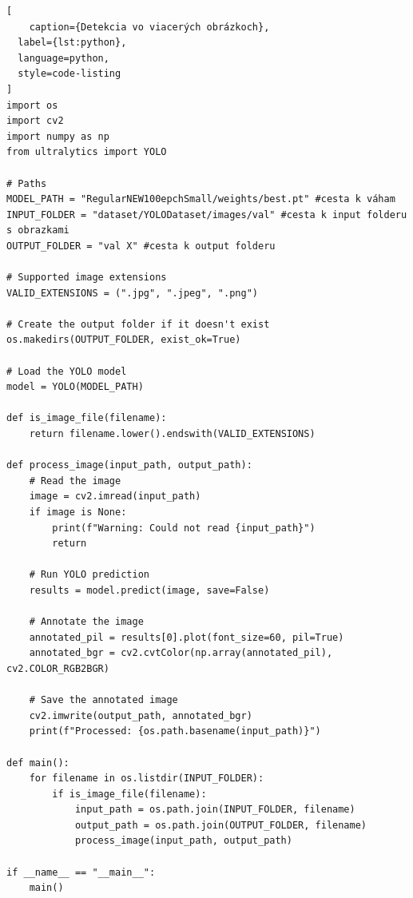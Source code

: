 \begin{lstlisting}[
    caption={Detekcia vo viacerých obrázkoch},
  label={lst:python},
  language=python,
  style=code-listing
]
import os
import cv2
import numpy as np
from ultralytics import YOLO

# Paths
MODEL_PATH = "RegularNEW100epchSmall/weights/best.pt" #cesta k váham
INPUT_FOLDER = "dataset/YOLODataset/images/val" #cesta k input folderu s obrazkami
OUTPUT_FOLDER = "val X" #cesta k output folderu

# Supported image extensions
VALID_EXTENSIONS = (".jpg", ".jpeg", ".png")

# Create the output folder if it doesn't exist
os.makedirs(OUTPUT_FOLDER, exist_ok=True)

# Load the YOLO model
model = YOLO(MODEL_PATH)

def is_image_file(filename):
    return filename.lower().endswith(VALID_EXTENSIONS)

def process_image(input_path, output_path):
    # Read the image
    image = cv2.imread(input_path)
    if image is None:
        print(f"Warning: Could not read {input_path}")
        return

    # Run YOLO prediction
    results = model.predict(image, save=False)

    # Annotate the image
    annotated_pil = results[0].plot(font_size=60, pil=True)
    annotated_bgr = cv2.cvtColor(np.array(annotated_pil), cv2.COLOR_RGB2BGR)

    # Save the annotated image
    cv2.imwrite(output_path, annotated_bgr)
    print(f"Processed: {os.path.basename(input_path)}")

def main():
    for filename in os.listdir(INPUT_FOLDER):
        if is_image_file(filename):
            input_path = os.path.join(INPUT_FOLDER, filename)
            output_path = os.path.join(OUTPUT_FOLDER, filename)
            process_image(input_path, output_path)

if __name__ == "__main__":
    main()
\end{lstlisting}

